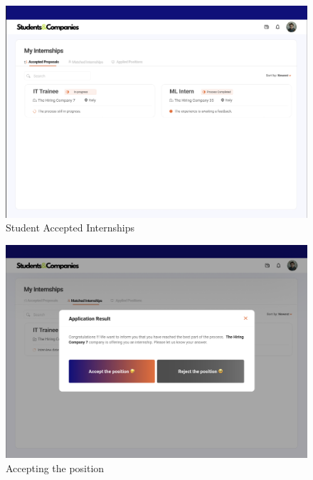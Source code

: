 \documentclass{article}
\begin{document}
\begin{figure}[H]
    \centering
    \includegraphics[scale = 0.42]{figures/UserInterfaces/Student/AcceptedProposals.png}
    \caption{Student Accepted Internships}
     \centering
\end{figure}
\begin{figure}[H]
    \centering
    \includegraphics[scale = 0.42]{figures/UserInterfaces/Student/AcceptPop-up.png}
    \caption{Accepting the position}
     \centering
\end{figure}
\end{document}

